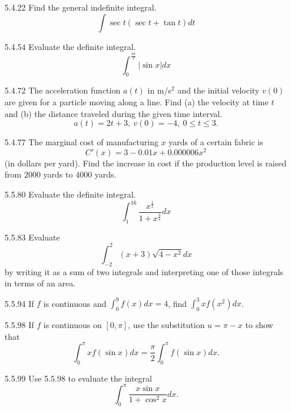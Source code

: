 \documentclass{article}
\begin{document}
\begin{enumerate}
\item[5.4.22] Find the general indefinite integral.
    \[
        \int \sec t (\sec t + \tan t  ) dt
    \]

\vspace{6cm}

\item[5.4.54] Evaluate the definite integral.
    \[
        \int_{0}^{ \frac{3\pi}{2}}  | \sin x | dx
    \]

\vspace{6cm}

\item[5.4.72]
    The acceleration function $a(t)$ in m/s$^2$ and the initial velocity $v(0)$ are given for a particle moving
    along a line. Find (a) the velocity at time $t$ and (b) the distance traveled during the given time
    interval.
    \[
        a(t) = 2t + 3,\ v(0) = -4,\ 0 \leqslant t \leqslant 3.
    \]

\newpage

\item[5.4.77] The marginal cost of manufacturing $x$ yards of a certain fabric is
    \[
        C'(x) = 3 - 0.01x + 0.000006x^{2}
    \]
    (in dollars per yard). Find the increase in cost if the production level
    is raised from $2000$ yards to $4000$ yards.

\vspace{6cm}

\item[5.5.80]
    Evaluate the definite integral.
    \[
        \int_{1}^{16} \frac{x^{\frac{1}{2}}}{1+x^{\frac{3}{4}}} dx
    \]

\vspace{6cm}

\item[5.5.83]
    Evaluate
    \[
        \int_{-2}^{2} (x+3)\sqrt{4-x^{2}}dx
    \]
    by writing it as a sum of two integrals and interpreting one of those
    integrals in terms of an area.

\newpage

\item[5.5.94]
    If $f$ is continuous and $\displaystyle \int_{0}^{9} f(x) dx = 4$, find
    $\displaystyle  \int_{0}^{3} xf(x^{2}) dx$.

\vspace{6cm}

\item[5.5.98]
    If $f$ is continuous on $[0, \pi ]$, use the substitution $u = \pi - x$
    to show that
    \[
        \int_{0}^{\pi} xf(\sin x) dx = \frac{\pi}{2} \int_{0}^{\pi} f(\sin x ) dx.
    \]

\vspace{6cm}

\item[5.5.99]
    Use 5.5.98 to evaluate the integral
    \[
        \int_{0}^{\pi} \frac{x \sin x }{1 + \cos^{2} x }dx.
    \]
\end{enumerate}
\end{document}
